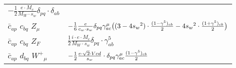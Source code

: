 \begin{center}
\begin{tabular}{|l|l|}
	$-\frac{1}{2}\frac{ e \cdot M_c}{ M_W \cdot s_w}\delta_{p q} \cdot \delta_{a b} $\\[2mm]
$\bar{c}{}_{a p }$ \phantom{-} $c{}_{b q }$ \phantom{-} ${Z}_{\mu }$ \phantom{-}  &
	$-\frac{1}{6}\frac{ e}{ c_w \cdot s_w}\delta_{p q} \gamma_{a c}^\mu \big( (3-4 s_w {}^2)\cdot {(1-\gamma^5)_{c b}\over 2} -4 s_w{}^2 \cdot {(1+\gamma^5)_{c b}\over 2} \big)$\\[2mm]
$\bar{c}{}_{a p }$ \phantom{-} $c{}_{b q }$ \phantom{-} $Z_F{}_{}$ \phantom{-}  &
	$\frac{1}{2}\frac{ i \cdot e \cdot M_c}{ M_W \cdot s_w}\delta_{p q} \cdot \gamma_{a b}^5 $\\[2mm]
$\bar{c}{}_{a p }$ \phantom{-} $d{}_{b q }$ \phantom{-} $W^+{}_{\mu }$ \phantom{-}  &
	$-\frac{1}{2}\frac{ e \cdot\sqrt{2} \cdot Vcd}{ s_w}\cdot \delta_{p q} \gamma_{a c}^\mu {(1-\gamma^5)_{c b}\over 2} $\\ \hline
\end{tabular}


\end{center}
